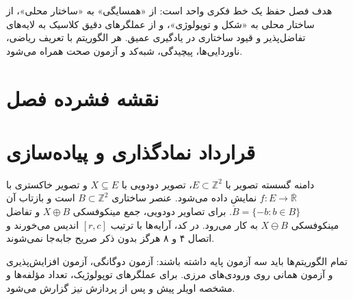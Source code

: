 \documentclass[12pt,openany,oneside]{book}
\begin{document}
\begin{goalbox}
هدف فصل حفظ یک خط فکری واحد است: از «همسایگی» به «ساختار محلی»، از ساختار محلی به «شکل و توپولوژی»،
و از عملگرهای دقیق کلاسیک به لایه‌های تفاضل‌پذیر و قیود ساختاری در یادگیری عمیق. هر الگوریتم با تعریف ریاضی،
ناوردایی‌ها، پیچیدگی، شبه‌کد و آزمون صحت همراه می‌شود.
\end{goalbox}

\chapter*{نقشه فشرده فصل}
\begin{center}
\end{center}

\chapter*{قرارداد نمادگذاری و پیاده‌سازی}
دامنه گسسته تصویر با \(E\subset\mathbb Z^2\)، تصویر دودویی با \(X\subseteq E\) و تصویر خاکستری با
\(f:E\to\overline{\mathbb R}\) نمایش داده می‌شود. عنصر ساختاری \(B\subset\mathbb Z^2\) است و بازتاب آن
\(\check B=\{-b:b\in B\}\). برای تصاویر دودویی، جمع مینکوفسکی \(X\oplus B\) و تفاضل مینکوفسکی
\(X\ominus B\) به کار می‌رود. در کد، آرایه‌ها با ترتیب \([r,c]\) اندیس می‌خورند و اتصال ۴ و ۸ هرگز
بدون ذکر صریح جابه‌جا نمی‌شوند.

\begin{codecontract}
تمام الگوریتم‌ها باید سه آزمون پایه داشته باشند: آزمون دوگانگی، آزمون افزایش‌پذیری و آزمون همانی روی ورودی‌های
مرزی. برای عملگرهای توپولوژیک، تعداد مؤلفه‌ها و مشخصه اویلر پیش و پس از پردازش نیز گزارش می‌شود.
\end{codecontract}
\end{document}
